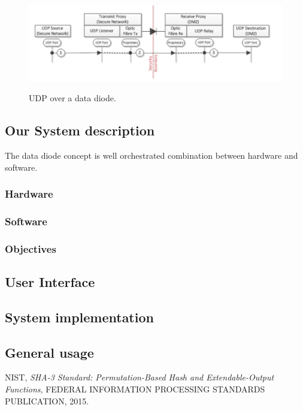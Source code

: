\documentclass[a4paper,10pt]{article}
\begin{document}
 
\begin{figure}
\centering
\includegraphics[scale=0.5]{images/UDPOverDD.png}
\label{fig:UDPDD}
\caption{UDP over a data diode.}
\end{figure}


\subsection{Our System description}
The data diode concept is well orchestrated combination between hardware and software.
\subsubsection{Hardware}
\subsubsection{Software}
\subsubsection{Objectives}
\subsection{User Interface}
\subsection{System implementation}
\subsection{General usage}


\begin{thebibliography}{9}

NIST,
\textit{SHA-3 Standard: Permutation-Based Hash and Extendable-Output Functions},
FEDERAL INFORMATION PROCESSING STANDARDS PUBLICATION,
2015.

\end{thebibliography}
\end{document}
